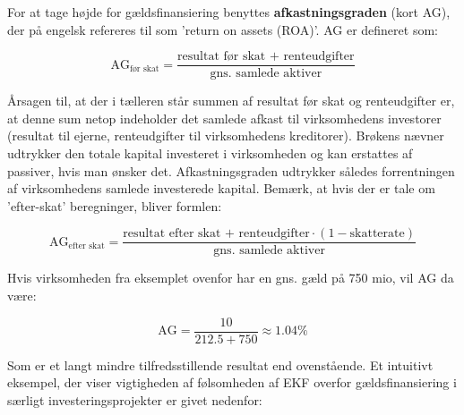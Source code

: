 \documentclass[10pt,reqno, usenames]{article}
\begin{document}
\vspace{10 pt}

For at tage højde for gældsfinansiering benyttes \textbf{afkastningsgraden} (kort AG), der på engelsk refereres til som 'return on assets (ROA)'. AG er defineret som: 

\begin{equation}
    \text{AG}_{\text{før skat}} = \frac{\text{resultat før skat + renteudgifter}}{\text{gns. samlede aktiver}}
\end{equation}

Årsagen til, at der i tælleren står summen af resultat før skat og renteudgifter er, at denne sum netop indeholder det samlede afkast til virksomhedens investorer (resultat til ejerne, renteudgifter til virksomhedens kreditorer). Brøkens nævner udtrykker den totale kapital investeret i virksomheden og kan erstattes af passiver, hvis man ønsker det. Afkastningsgraden udtrykker således forrentningen af virksomhedens samlede investerede kapital. Bemærk, at hvis der er tale om 'efter-skat' beregninger, bliver formlen: 

\begin{equation}
    \text{AG}_{\text{efter skat}} = \frac{\text{resultat efter skat + renteudgifter} \cdot (1 - \text{skatterate})}{\text{gns. samlede aktiver}}
\end{equation}

Hvis virksomheden fra eksemplet ovenfor har en gns. gæld på 750 mio, vil AG da være: 

\begin{equation}
    \text{AG} = \frac{10}{212.5 + 750} \approx 1.04 \% \nonumber
\end{equation}

Som er et langt mindre tilfredsstillende resultat end ovenstående. Et intuitivt eksempel, der viser vigtigheden af følsomheden af EKF overfor gældsfinansiering i særligt investeringsprojekter er givet nedenfor: 
\end{document}
